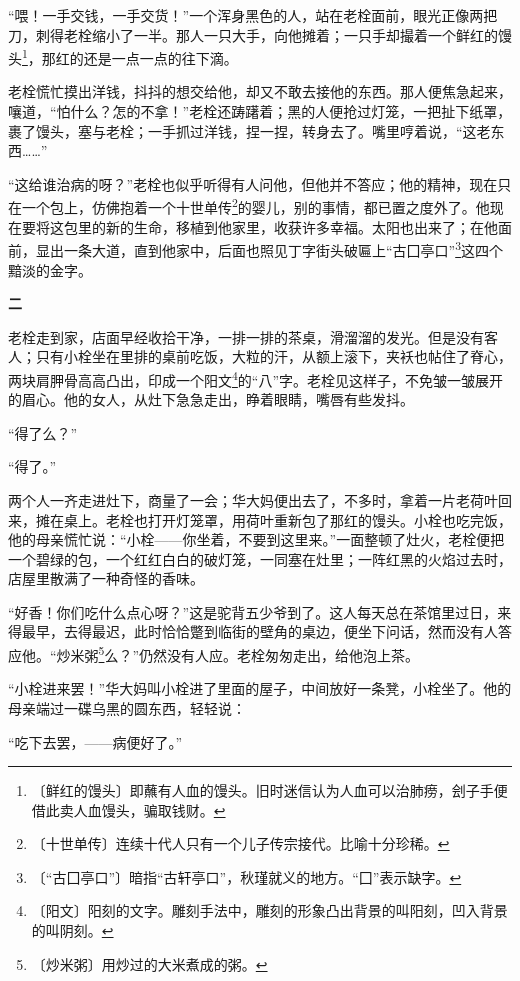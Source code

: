 \documentclass[12pt,UTF-8,openany]{ctexbook}
\begin{document}
\begin{large}
    “喂！一手交钱，一手交货！”一个浑身黑色的人，站在老栓面前，眼光正像两把刀，刺得老栓缩小了一半。那人一只大手，向他摊着；一只手却撮着一个鲜红的馒头\footnote{〔鲜红的馒头〕即蘸有人血的馒头。旧时迷信认为人血可以治肺痨，刽子手便借此卖人血馒头，骗取钱财。}，那红的还是一点一点的往下滴。
    
    老栓慌忙摸出洋钱，抖抖的想交给他，却又不敢去接他的东西。那人便焦急起来，嚷道，“怕什么？怎的不拿！”老栓还踌躇着；黑的人便抢过灯笼，一把扯下纸罩，裹了馒头，塞与老栓；一手抓过洋钱，捏一捏，转身去了。嘴里哼着说，“这老东西……”
    
    “这给谁治病的呀？”老栓也似乎听得有人问他，但他并不答应；他的精神，现在只在一个包上，仿佛抱着一个十世单传\footnote{〔十世单传〕连续十代人只有一个儿子传宗接代。比喻十分珍稀。}的婴儿，别的事情，都已置之度外了。他现在要将这包里的新的生命，移植到他家里，收获许多幸福。太阳也出来了；在他面前，显出一条大道，直到他家中，后面也照见丁字街头破匾上“古囗亭口”\footnote{〔“古囗亭口”〕暗指“古轩亭口”，秋瑾就义的地方。“囗”表示缺字。}这四个黯淡的金字。
    
    \begin{center}\textbf{二}\end{center}
    
    老栓走到家，店面早经收拾干净，一排一排的茶桌，滑溜溜的发光。但是没有客人；只有小栓坐在里排的桌前吃饭，大粒的汗，从额上滚下，夹袄也帖住了脊心，两块肩胛骨高高凸出，印成一个阳文\footnote{〔阳文〕阳刻的文字。雕刻手法中，雕刻的形象凸出背景的叫阳刻，凹入背景的叫阴刻。}的“八”字。老栓见这样子，不免皱一皱展开的眉心。他的女人，从灶下急急走出，睁着眼睛，嘴唇有些发抖。
    
    “得了么？”
    
    “得了。”
    
    两个人一齐走进灶下，商量了一会；华大妈便出去了，不多时，拿着一片老荷叶回来，摊在桌上。老栓也打开灯笼罩，用荷叶重新包了那红的馒头。小栓也吃完饭，他的母亲慌忙说：“小栓——你坐着，不要到这里来。”一面整顿了灶火，老栓便把一个碧绿的包，一个红红白白的破灯笼，一同塞在灶里；一阵红黑的火焰过去时，店屋里散满了一种奇怪的香味。
    
    “好香！你们吃什么点心呀？”这是驼背五少爷到了。这人每天总在茶馆里过日，来得最早，去得最迟，此时恰恰蹩到临街的壁角的桌边，便坐下问话，然而没有人答应他。“炒米粥\footnote{〔炒米粥〕用炒过的大米煮成的粥。}么？”仍然没有人应。老栓匆匆走出，给他泡上茶。
    
    “小栓进来罢！”华大妈叫小栓进了里面的屋子，中间放好一条凳，小栓坐了。他的母亲端过一碟乌黑的圆东西，轻轻说：
    
    “吃下去罢，——病便好了。”
    

\end{large}
\end{document}
